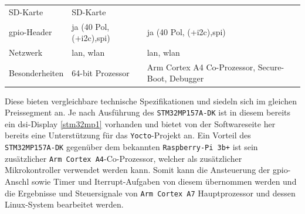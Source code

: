 \begin{longtable}[]{@{}lll@{}}
\begin{minipage}[t]{0.26\columnwidth}
SD-Karte\strut
\end{minipage} & \begin{minipage}[t]{0.49\columnwidth}\raggedright
SD-Karte\strut
\end{minipage}\tabularnewline
\begin{minipage}[t]{0.17\columnwidth}\raggedright
\gls{gpio}-Header\strut
\end{minipage} & \begin{minipage}[t]{0.26\columnwidth}\raggedright
ja (40 Pol, (+i2c),\gls{spi})\strut
\end{minipage} & \begin{minipage}[t]{0.49\columnwidth}\raggedright
ja (40 Pol, (+i2c),\gls{spi})\strut
\end{minipage}\tabularnewline
\begin{minipage}[t]{0.17\columnwidth}\raggedright
Netzwerk\strut
\end{minipage} & \begin{minipage}[t]{0.26\columnwidth}\raggedright
\gls{lan}, \gls{wlan}\strut
\end{minipage} & \begin{minipage}[t]{0.49\columnwidth}\raggedright
\gls{lan}, \gls{wlan}\strut
\end{minipage}\tabularnewline
\begin{minipage}[t]{0.17\columnwidth}\raggedright
Besonderheiten\strut
\end{minipage} & \begin{minipage}[t]{0.26\columnwidth}\raggedright
64-bit Prozessor\strut
\end{minipage} & \begin{minipage}[t]{0.49\columnwidth}\raggedright
Arm Cortex A4 Co-Prozessor, Secure-Boot, Debugger\strut
\end{minipage}\tabularnewline
\bottomrule
\end{longtable}

Diese bieten vergleichbare technische Spezifikationen und siedeln sich
im gleichen Preissegment an. Je nach Ausführung des
\passthrough{\lstinline!STM32MP157A-DK!} ist in diesem bereits ein
\gls{dsi}-Display \ref{stm32mp1} vorhanden und bietet von der
Softwareseite her bereits eine Unterstützung für das
\passthrough{\lstinline!Yocto!}-Projekt an. Ein Vorteil des
\passthrough{\lstinline!STM32MP157A-DK!} gegenüber dem bekannten
\passthrough{\lstinline!Raspberry-Pi 3b+!} ist sein zusätzlicher
\passthrough{\lstinline!Arm Cortex A4!}-Co-Prozessor, welcher als
zusätzlicher Mikrokontroller verwendet werden kann. Somit kann die
Ansteuerung der \gls{gpio}-Anschl sowie Timer und Iterrupt-Aufgaben von
diesem übernommen werden und die Ergebnisse und Steuersignale von
\passthrough{\lstinline!Arm Cortex A7!} Hauptprozessor und dessen
Linux-System bearbeitet werden.

